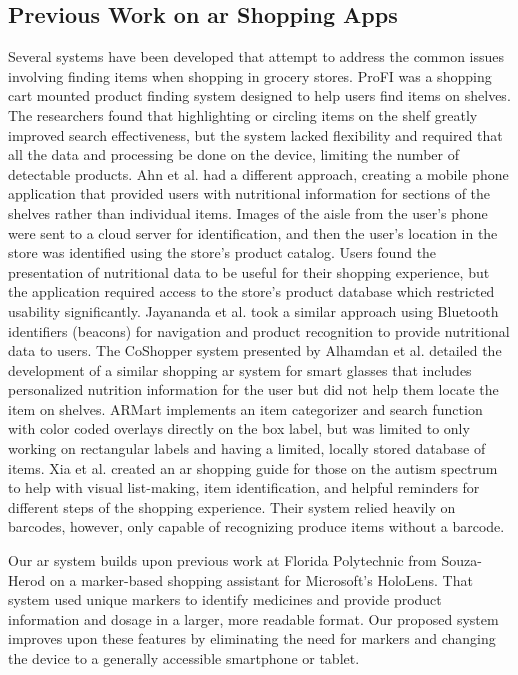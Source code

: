 \documentclass[thesis]{fputhesis}
\begin{document}
\begin{body}
\section{Previous Work on \acrshort{ar} Shopping Apps}
Several systems have been developed that attempt to address the common issues involving finding items when shopping in grocery stores. ProFI \cite{li_profi_2013} was a shopping cart mounted product finding system designed to help users find items on shelves. The researchers found that highlighting or circling items on the shelf greatly improved search effectiveness, but the system lacked flexibility and required that all the data and processing be done on the device, limiting the number of detectable products. Ahn et al. \cite{ahn_supporting_2015} had a different approach, creating a mobile phone application that provided users with nutritional information for sections of the shelves rather than individual items. Images of the aisle from the user's phone were sent to a cloud server for identification, and then the user's location in the store was identified using the store's product catalog. Users found the presentation of nutritional data to be useful for their shopping experience, but the application required access to the store's product database which restricted usability significantly. Jayananda et al.\cite{jayananda_augmented_2018} took a similar approach using Bluetooth identifiers (beacons) for navigation and product recognition to provide nutritional data to users. 
\filbreak
The CoShopper system presented by Alhamdan et al. \cite{alhamdan_extended_2020} detailed the development of a similar shopping \acrshort{ar} system for smart glasses that 
includes personalized nutrition information for the user but did not help them locate the item on shelves. ARMart \cite{roddiger_armart_2018} implements an item categorizer and search function with color coded overlays directly on the box label, but was limited to only working on rectangular labels and having a limited, locally stored database of items. Xia et al. \cite{xia_parashop_2020} created an \acrshort{ar} shopping guide for those on the autism spectrum to help with visual list-making, item identification, and helpful 
reminders for different steps of the shopping experience. Their system relied heavily on barcodes, however, only capable of recognizing produce items without a barcode. 

Our \acrshort{ar} system builds upon previous work at Florida Polytechnic from Souza-Herod \cite{souza-herod_augmented_2021} on a marker-based shopping assistant for Microsoft's HoloLens. That system used unique markers to identify medicines and provide product information and dosage in a larger, more readable format. Our proposed system improves upon these features by eliminating the need for markers and changing the device to a generally accessible smartphone or tablet. 


\end{body}
\end{document}
